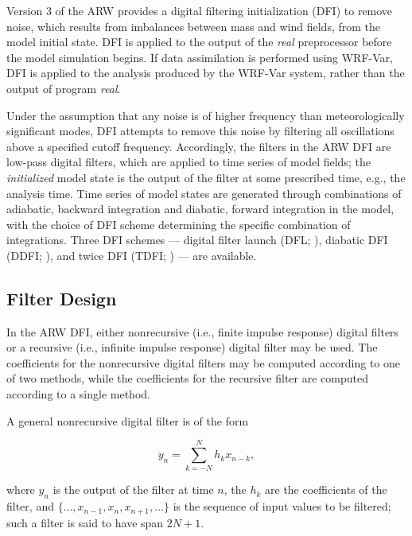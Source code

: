 Version 3 of the ARW provides a digital filtering initialization (DFI) to 
remove noise, which results from imbalances between mass and wind fields, 
from the model initial state. DFI is applied to the output of the {\it real} 
preprocessor before the model simulation begins. If data assimilation is 
performed using WRF-Var, DFI is applied to the analysis produced by the 
WRF-Var system, rather than the output of program {\it real}.

Under the assumption that any noise is of 
higher frequency than meteorologically significant modes, DFI attempts to 
remove this noise by filtering all oscillations above a specified cutoff 
frequency. Accordingly, the filters in the ARW DFI are low-pass digital 
filters, which are applied to time series of model fields; the {\it initialized} 
model state is the output of the filter at some prescribed time, 
e.g., the analysis time. Time series of model states are generated through 
combinations of adiabatic, backward integration and diabatic, forward 
integration in the model,  with the choice of DFI scheme determining the 
specific combination of integrations. Three DFI schemes --- digital filter 
launch (DFL; \cite{lynchhuang94}), diabatic DFI (DDFI; \cite{huanglynch93}), 
and twice DFI (TDFI; \cite{lynchhuang94}) ---  are available.

\subsection{Filter Design}

In the ARW DFI, either nonrecursive (i.e., finite impulse response) digital 
filters or a recursive (i.e., infinite impulse response) digital filter may 
be used. The coefficients for the nonrecursive digital filters may be 
computed according to one of two methods, while the coefficients for the 
recursive filter are computed according to a single method.

A general nonrecursive digital filter is of the form

\begin{equation}
y_n = \sum_{k=-N}^{N} h_k x_{n-k},
\label{fir_filter}
\end{equation}

\noindent
where $y_n$ is the output of the filter at time $n$, the $h_k$ are the 
coefficients of the filter, and $\{ \ldots , x_{n-1}, x_n, x_{n+1}, \ldots \}$ 
is the sequence of input values to be filtered; such a filter is said to have 
span $2N+1$. 

